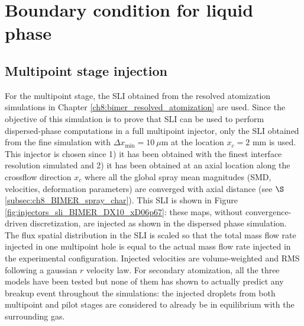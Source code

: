 \section{Boundary condition for liquid phase}
\label{sec:ch9_BIMER_BCs_for_liquid_phase}


\subsection{Multipoint stage injection}

For the multipoint stage, the SLI obtained from the resolved atomization simulations in Chapter \ref{ch8:bimer_resolved_atomization} are used. Since the objective of this simulation is to prove that SLI can be used to perform dispersed-phase computations in a full multipoint injector, only the SLI obtained from the fine simulation with $\Delta x_\mathrm{min} = 10~\mu$m at the location $x_c = 2$ mm is used. This injector is chosen since 1) it has been obtained with the finest interface resolution simulated and 2) it has been obtained at an axial location along the crossflow direction $x_c$ where all the global spray mean magnitudes (SMD, velocities, deformation parameters) are converged with axial distance (see $\S$\ref{subsec:ch8_BIMER_spray_char}). This SLI is shown in Figure \ref{fig:injectors_sli_BIMER_DX10_xD06p67}: these maps, without convergence-driven discretization, are injected as shown in the dispersed phase simulation. The flux spatial distribution in the SLI is scaled so that the total mass flow rate injected in one multipoint hole is equal to the actual mass flow rate injected in the experimental configuration. Injected velocities are volume-weighted and RMS following a gaussian $r$ velocity law. For secondary atomization, all the three models have been tested but none of them has shown to actually predict any breakup event throughout the simulations: the injected droplets from both multipoint and pilot stages are considered to already be in equilibrium with the surrounding gas.



